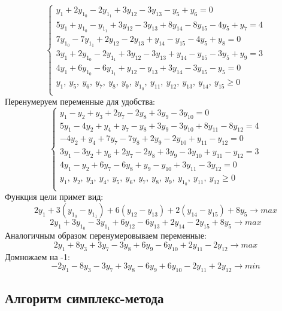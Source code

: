 \documentclass{article}
\begin{document}
\begin{equation*}
\begin{cases}
  y_1 + 2y_1_0 - 2y_1_1 + 3y_{12} - 3y_{13} - y_5 + y_6 = 0\\
  5y_1 + y_1_0 - y_1_1 + 3y_{12} - 3y_{13} + 8y_{14} - 8y_{15} - 4y_5 + y_7 = 4\\
  7y_1_0 - 7y_1_1 + 2y_{12} - 2y_{13} + y_{14} - y_{15} - 4y_5 + y_8 = 0\\
  3y_1 + 2y_1_0 - 2y_1_1 + 3y_{12} - 3y_{13} + y_{14} - y_{15} - 3y_5 + y_9 = 3\\
  4y_1 + 6y_1_0 - 6y_1_1 + y_{12} - y_{13} + 3y_{14} - 3y_{15} - y_5 = 0\\
  y_1, ~y_5, ~y_6, ~y_7, ~y_8, ~y_9, ~y_1_0, ~y_{11}, ~y_{12}, ~y_{13}, ~y_{14}, ~y_{15} \ge 0\\
 \end{cases}      
\end{equation*}
Перенумеруем переменные для удобства:
\begin{equation*}
\begin{cases}
  y_1 - y_2 + y_3 + 2y_7 - 2y_8 + 3y_9 - 3y_{10} = 0\\
  5y_1 - 4y_2 + y_4 + y_7 - y_8 + 3y_9 - 3y_{10} + 8y_{11} - 8y_{12} = 4\\
  - 4y_2 + y_4 + 7y_7 - 7y_8 + 2y_9 - 2y_{10} + y_{11} - y_{12} = 0\\
  3y_1 - 3y_2 + y_6 + 2y_7 - 2y_8 + 3y_9 - 3y_{10} + y_{11} - y_{12} = 3\\
  4y_1 - y_2 + 6y_7 - 6y_8 + y_9 - y_{10} + 3y_{11} - 3y_{12} = 0\\
  y_1, ~y_2, ~y_3, ~y_4, ~y_5, ~y_6, ~y_7, ~y_8, ~y_9, ~y_1_0, ~y_{11}, ~y_{12} \ge 0\\
 \end{cases}      
\end{equation*}
Функция цели примет вид:
$$2y_1 + 3(y_1_0 - y_1_1) + 6(y_{12} - y_{13}) + 2(y_{14} - y_{15}) + 8y_5 \rightarrow max$$
$$2y_1 + 3y_1_0 - 3y_1_1 + 6y_{12} - 6y_{13} + 2y_{14} - 2y_{15} + 8y_5 \rightarrow max$$
Аналогичным образом перенумеровываем переменные:
$$2y_1 + 8y_3 + 3y_7 - 3y_8 + 6y_9 - 6y_{10} + 2y_{11} - 2y_{12} \rightarrow max$$
Домножаем на -1:
\begin{equation*}
 -2y_1 - 8y_3 - 3y_7 + 3y_8 - 6y_9 + 6y_{10} - 2y_{11} + 2y_{12} \rightarrow min
\end{equation*}

\subsection {Алгоритм симплекс-метода}
\end{document}
